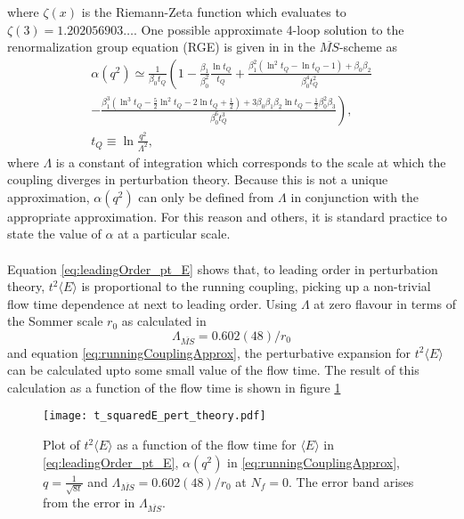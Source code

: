 \documentclass[a4paper,10pt]{article}
\begin{document}
where $\zeta(x)$ is the Riemann-Zeta function which evaluates to $\zeta(3) = 1.202056903 \ldots$. One possible approximate 4-loop solution to the renormalization group equation (RGE) is given in \cite{AgasheK2016ROPP} in the $\overline{MS}$-scheme as
\begin{equation}\label{eq:runningCouplingApprox}
\begin{gathered}
\alpha\left(q^{2}\right) \simeq \frac{1}{\beta_{0} t_Q}\left(1-\frac{\beta_{1}}{\beta_{0}^{2}} \frac{\ln t_Q}{t_Q}+\frac{\beta_{1}^{2}\left(\ln ^{2} t_Q-\ln t_Q-1\right)+\beta_{0} \beta_{2}}{\beta_{0}^{4} t_Q^{2}}\right. \\
\left.-\frac{\beta_{1}^{3}\left(\ln ^{3} t_Q-\frac{5}{2} \ln ^{2} t_Q-2 \ln t_Q+\frac{1}{2}\right)+3 \beta_{0} \beta_{1} \beta_{2} \ln t_Q-\frac{1}{2} \beta_{0}^{2} \beta_{3}}{\beta_{0}^{6} t_Q^{3}}\right), \\
t_Q \equiv \ln \frac{q^{2}}{\Lambda^{2}},
\end{gathered}
\end{equation}
where $\Lambda$ is a constant of integration which corresponds to the scale at which the coupling diverges in perturbation theory. Because this is not a unique approximation, $\alpha\left(q^{2}\right)$ can only be defined from $\Lambda$ in conjunction with the appropriate approximation. For this reason and others, it is standard practice to state the value of $\alpha$ at a particular scale.\\\\Equation \eqref{eq:leadingOrder_pt_E} shows that, to leading order in perturbation theory, $t^{2}\langle E\rangle$ is proportional to the running coupling, picking up a non-trivial flow time dependence at next to leading order. Using $\Lambda$ at zero flavour in terms of the Sommer scale $r_0$ as calculated in \cite{CapitaniStefano1999Nqmr}
\begin{equation}
\Lambda_{\overline{MS}}=0.602(48) / r_{0}
\end{equation}
and equation \eqref{eq:runningCouplingApprox}, the perturbative expansion for $t^2\langle E \rangle$ can be calculated upto some small value of the flow time. The result of this calculation as a function of the flow time is shown in figure \ref{fig:t_squared_E_perturbativeExpansion}
\begin{figure}[H]
\centering
\texttt{[image: t\_squaredE\_pert\_theory.pdf]}
\caption[]{Plot of $t^2\langle E\rangle$ as a function of the flow time for $\langle E\rangle$ in \eqref{eq:leadingOrder_pt_E},  $\alpha\left(q^{2}\right)$ in \eqref{eq:runningCouplingApprox}, $q=\frac{1}{\sqrt{8t}}$ and $\Lambda_{\overline{MS}}=0.602(48) / r_{0}$ at $N_f=0$. The error band arises from the error in $\Lambda_{\overline{MS}}$.}\label{fig:t_squared_E_perturbativeExpansion}
\end{figure}
\end{document}
